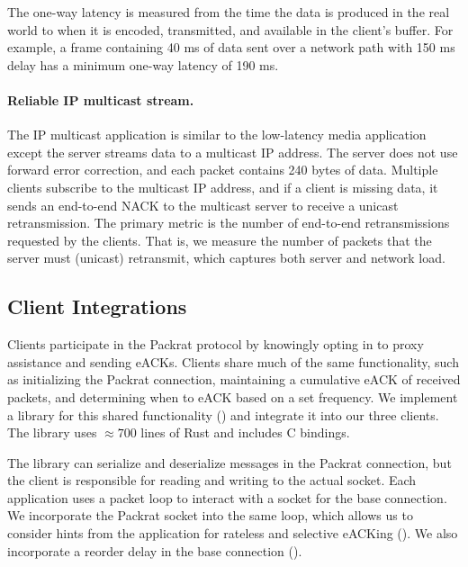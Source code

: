 The one-way latency is measured from the time the data is produced in the real
world to when it is encoded, transmitted, and available in the client's
buffer. For example, a frame containing 40 ms of data sent over a network path
with 150 ms delay has a minimum one-way latency of 190 ms.

\paragraph{Reliable IP multicast stream.}

The IP multicast application is similar to the low-latency media application
except the server streams data to a multicast IP address. The server does not
use forward error correction, and each packet contains 240 bytes of data. Multiple clients
subscribe to the multicast IP address, and if a client is missing data,
it sends an end-to-end NACK to the
multicast server to receive a unicast retransmission.
The primary metric is the number of end-to-end retransmissions requested by
the clients. That is, we measure the number of packets that the server
must (unicast) retransmit, which captures both server and network load.

\subsection{Client Integrations}



Clients participate in the Packrat protocol by knowingly opting in to proxy
assistance and sending eACKs. Clients share much of the same functionality,
such as initializing the Packrat connection, maintaining a cumulative eACK of
received packets, and determining when to eACK based on a set frequency. We
implement a library for this shared functionality ()
and integrate it into our three clients.
The library uses $\approx\!700$ lines of Rust and includes C bindings.

The library can serialize and deserialize messages in the Packrat connection, but
the client is responsible for reading and writing to the actual socket. Each
application uses a packet loop to interact with a socket for the base
connection. We incorporate the Packrat socket into the same loop, which allows us to
consider hints from the application for rateless and selective eACKing
(). We also incorporate a reorder delay in the base
connection ().

